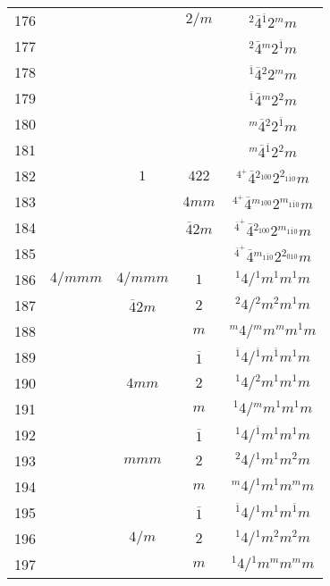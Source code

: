 \begin{longtable}{ccccc}
  176 &  &  & $2/m$ & ${}^{2} \overline{4} {}^{\overline{1}} 2 {}^{m} m $\\
  177 &  &  &  & ${}^{2} \overline{4} {}^{m} 2 {}^{\overline{1}} m $\\
  178 &  &  &  & ${}^{\overline{1}} \overline{4} {}^{2} 2 {}^{m} m $\\
  179 &  &  &  & ${}^{\overline{1}} \overline{4} {}^{m} 2 {}^{2} m $\\
  180 &  &  &  & ${}^{m} \overline{4} {}^{2} 2 {}^{\overline{1}} m $\\
  181 &  &  &  & ${}^{m} \overline{4} {}^{\overline{1}} 2 {}^{2} m $\\
  182 &  & $1$ & $422$ & ${}^{4^{+}} \overline{4} {}^{2_{100}} 2 {}^{2_{1\overline{1}0}} m $\\
  183 &  &  & $4mm$ & ${}^{4^{+}} \overline{4} {}^{m_{100}} 2 {}^{m_{1\overline{1}0}} m $\\
  184 &  &  & $\overline{4}2m$ & ${}^{\overline{4}^{+}} \overline{4} {}^{2_{100}} 2 {}^{m_{1\overline{1}0}} m $\\
  185 &  &  &  & ${}^{\overline{4}^{+}} \overline{4} {}^{m_{1\overline{1}0}} 2 {}^{2_{010}} m $\\
  186 & $4/mmm$ & $4/mmm$ & $1$ & ${}^{1} 4  / {}^{1} m {}^{1} m {}^{1} m $\\
  187 &  & $\overline{4}2m$ & $2$ & ${}^{2} 4  / {}^{2} m {}^{2} m {}^{1} m $\\
  188 &  &  & $m$ & ${}^{m} 4  / {}^{m} m {}^{m} m {}^{1} m $\\
  189 &  &  & $\overline{1}$ & ${}^{\overline{1}} 4  / {}^{\overline{1}} m {}^{\overline{1}} m {}^{1} m $\\
  190 &  & $4mm$ & $2$ & ${}^{1} 4  / {}^{2} m {}^{1} m {}^{1} m $\\
  191 &  &  & $m$ & ${}^{1} 4  / {}^{m} m {}^{1} m {}^{1} m $\\
  192 &  &  & $\overline{1}$ & ${}^{1} 4  / {}^{\overline{1}} m {}^{1} m {}^{1} m $\\
  193 &  & $mmm$ & $2$ & ${}^{2} 4  / {}^{1} m {}^{1} m {}^{2} m $\\
  194 &  &  & $m$ & ${}^{m} 4  / {}^{1} m {}^{1} m {}^{m} m $\\
  195 &  &  & $\overline{1}$ & ${}^{\overline{1}} 4  / {}^{1} m {}^{1} m {}^{\overline{1}} m $\\
  196 &  & $4/m$ & $2$ & ${}^{1} 4  / {}^{1} m {}^{2} m {}^{2} m $\\
  197 &  &  & $m$ & ${}^{1} 4  / {}^{1} m {}^{m} m {}^{m} m $\\

\end{longtable}
